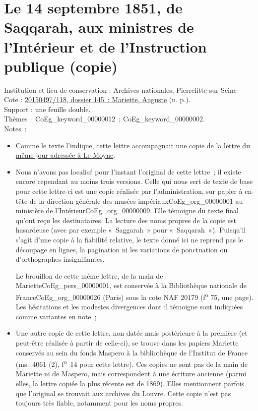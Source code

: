 \documentclass{book}
\begin{document}
\hypertarget{CoEg_Mariette_1851-09-14b}{}
\section*{Le 14 septembre 1851, de Saqqarah, aux ministres de l’Intérieur et de l’Instruction publique (copie)} 
{\footnotesize
\noindent Institution et lieu de conservation : Archives nationales, Pierrefitte-sur-Seine\\
Cote : \hyperlink{CoEg_Mariette_ms_001}{20150497/118, dossier 145~: Mariette, Auguste} (n. p.).\\
Support : une feuille double.\\
Thèmes~: \gls{CoEg_keyword_00000012}~; \gls{CoEg_keyword_00000002}.\\
Notes~: \begin{itemize} \item Comme le texte l’indique, cette lettre accompagnait une copie de \hyperlink{CoEg_Mariette_1851-09-14a}{la lettre du même jour adressée à Le Moyne}.
\item Nous n’avons pas localisé pour l’instant l’original de cette lettre~; il existe encore cependant au moins trois versions. Celle qui nous sert de texte de base pour cette lettre-ci est une copie réalisée par l’administration, sur papier à en-tête de la direction générale des musées impériaux\gls{CoEg_org_00000001} au ministère de l’Intérieur\gls{CoEg_org_00000009}. Elle témoigne du texte final qu’ont reçu les destinataires. La lecture des noms propres de la copie est hasardeuse (avec par exemple «~Saggarah~» pour «~Saqqarah~»). Puisqu’il s’agit d’une copie à la fiabilité relative, le texte donné ici ne reprend pas le découpage en lignes, la pagination ni les variations de ponctuation ou d’orthographes insignifiantes.
\par Le brouillon de cette même lettre, de la main de Mariette\gls{CoEg_pers_00000001}, est conservée à la Bibliothèque nationale de France\gls{CoEg_org_00000026} (Paris) sous la cote NAF 20179 (f\textsuperscript{o} 75, une page). Les hésitations et les modestes divergences dont il témoigne sont indiquées comme variantes en note~;
\item Une autre copie de cette lettre, non datée mais postérieure à la première (et peut-être réalisée à partir de celle-ci), se trouve dans les papiers Mariette conservés au sein du fonds Maspero à la bibliothèque de l’Institut de France (ms.~4061 (2), f\textsuperscript{o}~14 pour cette lettre). Ces copies ne sont pas de la main de Mariette ni de Maspero, mais correspondent à une écriture ancienne (parmi elles, la lettre copiée la plus récente est de 1869). Elles mentionnent parfois que l’original se trouvait aux archives du Louvre. Cette copie n’est pas toujours très fiable, notamment pour les noms propres. \end{itemize}}
\end{document}
